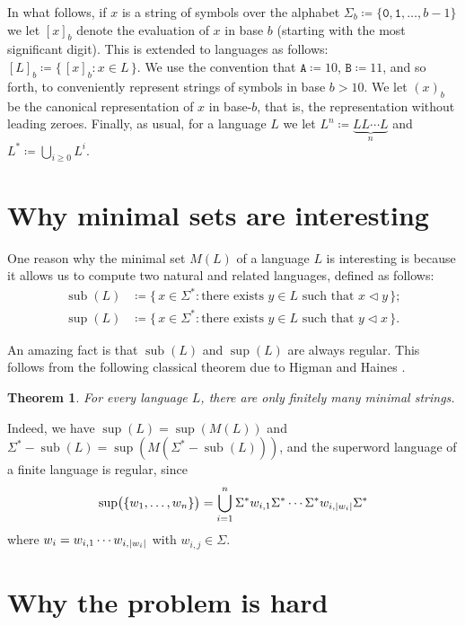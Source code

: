 \documentclass[12pt]{article}
\DeclarePairedDelimiter\abs{\lvert}{\rvert}
\DeclarePairedDelimiter\paren{\lparen}{\rparen}
\def\subw{\mathrel{\triangleleft}}
\DeclareMathOperator\supe{sup}
\DeclareMathOperator\subb{sub}
\theoremstyle{plain}
\newtheorem{theorem}{Theorem}
\theoremstyle{definition}
\theoremstyle{remark}
\newcommand{\0}{\mathtt{0}}
\newcommand{\1}{\mathtt{1}}
\newcommand{\2}{\mathtt{2}}
\newcommand{\3}{\mathtt{3}}
\newcommand{\4}{\mathtt{4}}
\newcommand{\5}{\mathtt{5}}
\newcommand{\6}{\mathtt{6}}
\newcommand{\7}{\mathtt{7}}
\newcommand{\8}{\mathtt{8}}
\newcommand{\9}{\mathtt{9}}
\newcommand{\A}{\mathtt{A}}
\newcommand{\B}{\mathtt{B}}
\newcommand{\set}[2]{\{\,#1{}:{}#2\,\}}
\begin{document}
In what follows, if $x$ is a string of symbols over the alphabet
$\Sigma_b \coloneqq \lbrace \0, \1, \dotsc, b-1 \rbrace$ we let 
$[x]_b$ denote the evaluation of $x$ in base $b$ (starting with the
most significant digit).  This is extended to languages as follows:
$[L]_b \coloneqq \set{ [x]_b }{ x \in L }$.
We use the convention that $\A \coloneqq 10$, $\B \coloneqq 11$, and so forth,
to conveniently represent strings of symbols in base $b > 10$.
We let $(x)_b$ be the canonical representation
of $x$ in base-$b$, that is, the representation without leading zeroes.
Finally, as usual, for a language $L$ we let
$L^n \coloneqq \underbrace{LL\dotsm L}_n$ and $L^* \coloneqq \bigcup_{i \geq 0} L^i$.

\section{Why minimal sets are interesting}

One reason why
the minimal set $M(L)$ of a language $L$ is interesting is because it
allows us to compute two natural and related languages,
defined as follows:
\begin{align*}
\subb(L) &\coloneqq \set{x \in \Sigma^*}{\text{there exists $y \in L$ such that $x \subw y$}} ; \\
\supe(L) &\coloneqq \set{x \in \Sigma^*}{\text{there exists $y \in L$ such that $y \subw x$}} .
\end{align*}

An amazing fact is that $\subb(L)$ and $\supe(L)$ are always regular.
This follows from
the following classical theorem due to Higman \cite{Hi52} and
Haines \cite{Ha69}.

\begin{theorem}
For every language $L$, there are only finitely many minimal strings.
\end{theorem}

Indeed, we have $\supe(L) = \supe(M(L))$
and $\Sigma^* - \subb(L) = \supe(M(\Sigma^* - \subb(L)))$, and
the superword language of a finite language is regular, since
\[ \supe\paren[\big]{\{w_1,\dotsc,w_n\}} = \bigcup_{i=1}^n \Sigma^* w_{i,1} \Sigma^* \dotsm \Sigma^* w_{i,\abs{w_i}} \Sigma^* \]
where $w_i=w_{i,1}\dotsm w_{i,\abs{w_i}}$ with $w_{i,j}\in\Sigma$.

\section{Why the problem is hard}
\end{document}
